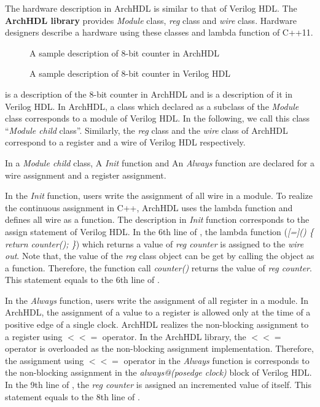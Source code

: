 The hardware description in ArchHDL is similar to that of Verilog HDL.
The \textbf{ArchHDL library} provides \textit{Module} class, \textit{reg} class and \textit{wire} class.
Hardware designers describe a hardware using these classes and lambda function of C++11.

\begin{figure}[t]
 
 \caption{A sample description of 8-bit counter in ArchHDL}
 \label{src:counter}
\end{figure}

\begin{figure}[t]
 
 \caption{A sample description of 8-bit counter in Verilog HDL}
 \label{src:counter_v}
\end{figure}

 is a description of the 8-bit counter in ArchHDL and
 is a description of it in Verilog HDL.
In ArchHDL, a class which declared as a subclass of the \textit{Module} class corresponds to a module of Verilog HDL.
In the following, we call this class ``\textit{Module child} class''.
Similarly, the \textit{reg} class and the \textit{wire} class of ArchHDL correspond to a register and a wire of Verilog HDL respectively. 

In a \textit{Module child} class, A \textit{Init} function and An \textit{Always} function are declared for a wire assignment and a register assignment.

In the \textit{Init} function, users write the assignment of all wire in a module.
To realize the continuous assignment in C++, ArchHDL uses the lambda function and defines all wire as a function.
The description in \textit{Init} function corresponds to the assign statement of Verilog HDL.
In the 6th line of , the lambda function (\textit{[=]() \{ return counter(); \}}) which returns a value of \textit{reg counter} is assigned to the \textit{wire out}.
Note that, the value of the \textit{reg} class object can be get by calling the object as a function.
Therefore, the function call \textit{counter()} returns the value of \textit{reg counter}.
This statement equals to the 6th line of .

In the \textit{Always} function, users write the assignment of all register in a module.
In ArchHDL, the assignment of a value to a register is allowed only at the time of a positive edge of a single clock.
ArchHDL realizes the non-blocking assignment to a register using $<<=$ operator.
In the ArchHDL library, the $<<=$ operator is overloaded as the non-blocking assignment implementation.
Therefore, the assignment using $<<=$ operator in the \textit{Always} function is corresponds to the non-blocking assignment in the \textit{always@(posedge clock)} block of Verilog HDL.
In the 9th line of , the \textit{reg counter} is assigned an incremented value of itself.
This statement equals to the 8th line of .

